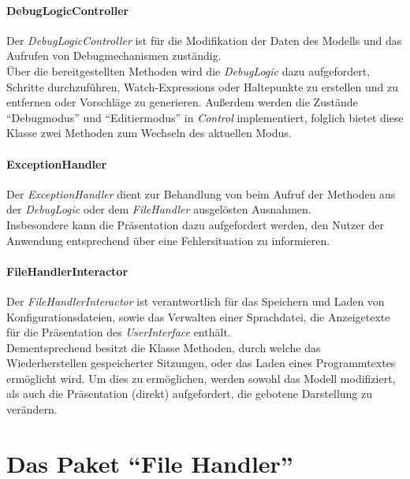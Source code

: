 \documentclass[parskip=full]{scrartcl}
\begin{document}
\paragraph{DebugLogicController}
   Der \textit{DebugLogicController} ist für die Modifikation der Daten des Modells und das Aufrufen von Debugmechanismen zuständig.\\
    Über die bereitgestellten Methoden wird die \textit{DebugLogic} dazu aufgefordert, Schritte durchzuführen, Watch-Expressions oder Haltepunkte zu erstellen und zu entfernen oder Vorschläge zu generieren.
    Außerdem werden die Zustände \enquote{Debugmodus} und \enquote{Editiermodus} in \textit{Control} implementiert, folglich bietet diese Klasse zwei Methoden zum Wechseln des aktuellen Modus.
\paragraph{ExceptionHandler}
  Der \textit{ExceptionHandler} dient zur Behandlung von beim Aufruf der Methoden aus der \textit{DebugLogic} oder dem \textit{FileHandler} ausgelösten Ausnahmen.\\
    Insbesondere kann die Präsentation dazu aufgefordert werden, den Nutzer der Anwendung entsprechend über eine Fehlersituation zu informieren.
\paragraph{FileHandlerInteractor}
  Der \textit{FileHandlerInteractor} ist verantwortlich für das Speichern und Laden von Konfigurationsdateien, sowie das Verwalten einer Sprachdatei, die Anzeigetexte für die Präsentation des \textit{UserInterface} enthält.\\
    Dementsprechend besitzt die Klasse Methoden, durch welche das Wiederherstellen gespeicherter Sitzungen, oder das Laden eines Programmtextes ermöglicht wird.
    Um dies zu ermöglichen, werden sowohl das Modell modifiziert, als auch die Präsentation (direkt) aufgefordert, die gebotene Darstellung zu verändern.

\section{Das Paket \enquote{File Handler}}
\label{FileHandler}
\end{document}
